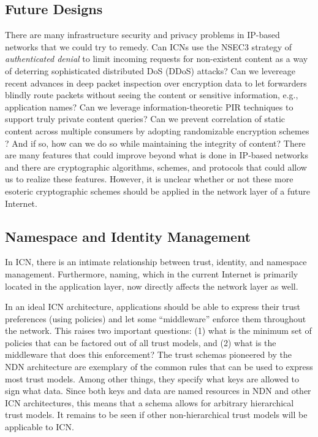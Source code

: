 \subsection{Future Designs}
There are many infrastructure security and privacy problems in IP-based networks that we could try to remedy.
Can ICNs use the NSEC3 strategy of \emph{authenticated denial} \cite{blacka2008dns} to limit incoming requests
for non-existent content as a way of deterring sophisticated distributed DoS (DDoS) attacks?
Can we levereage recent advances in deep packet inspection over encryption data \cite{sherry2015blindbox}
to let forwarders blindly route packets without seeing the content or sensitive information,
e.g., application names? Can we leverage information-theoretic PIR techniques \cite{pir-icn} to support
truly private content queries? Can we prevent correlation
of static content across multiple consumers by adopting randomizable encryption schemes \cite{blazy2011signatures}?
And if so, how can we do so while maintaining the integrity of content? There are many
features that could improve beyond what is done in IP-based networks and there are cryptographic
algorithms, schemes, and protocols that could allow us to realize these features. However,
it is unclear whether or not these more esoteric cryptographic schemes should be applied in
the network layer of a future Internet.

\subsection{Namespace and Identity Management}
In ICN, there is an intimate relationship between trust, identity, and namespace management.
Furthermore, naming, which in the current Internet is primarily located in the application
layer, now directly affects the network layer as well.

In an ideal ICN architecture, applications should be able to express their trust preferences
(using policies) and let some ``middleware'' enforce them throughout the network. This raises
two important questions: (1) what is the minimum set of policies that can be factored out of
all trust models, and (2) what is the middleware that does this enforcement? The trust schemas
pioneered by the NDN architecture \cite{schemas} are exemplary of the common rules that can be
used to express most trust models. Among other things, they specify what keys are allowed to
sign what data. Since both keys and data are named resources in NDN and other ICN architectures,
this means that a schema allows for arbitrary hierarchical trust models. It remains to be seen
if other non-hierarchical trust models will be applicable to ICN.

